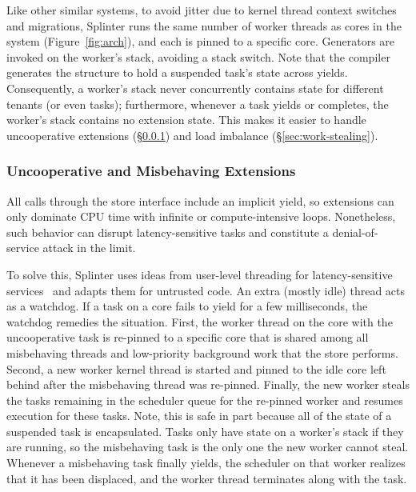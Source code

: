 
Like other similar systems, to avoid jitter due to kernel thread context
    switches and migrations, Splinter runs
    the same number of
  worker threads as cores in the system (Figure~\ref{fig:arch}), and each is
  pinned to a specific core.
Generators are invoked on the worker's stack, avoiding a stack switch.
Note that the compiler generates the structure to hold a suspended
  task's state across yields.
Consequently, a worker's stack never concurrently contains state for
  different tenants (or even tasks); furthermore, whenever a task
  yields or completes, the worker's stack contains no extension state.
This makes it easier to handle uncooperative extensions (\S\ref{sec:uncoop})
  and load imbalance (\S\ref{sec:work-stealing}).

\subsubsection{Uncooperative and Misbehaving Extensions}
\label{sec:uncoop}

All calls through the store interface include an implicit yield, so extensions
  can only dominate CPU time with infinite or compute-intensive loops.
Nonetheless, such behavior can disrupt latency-sensitive tasks and constitute a
  denial-of-service attack in the limit.

To solve this, Splinter uses ideas from user-level threading for
  latency-sensitive services~\cite{arachne-2018} and adapts them for
  untrusted code.
An extra (mostly idle) thread acts as a watchdog.
If a task on a core fails to yield for a few milliseconds, the watchdog
  remedies the situation.
First, the worker thread on the core with the uncooperative task is
  re-pinned to a specific core that is shared among all misbehaving threads
  and low-priority background work that the store performs.
Second, a new worker kernel thread is started and pinned to the idle core left behind
  after the misbehaving thread was re-pinned.
Finally, the new worker steals the tasks remaining in the scheduler queue for
  the re-pinned worker and resumes execution for these tasks.
Note, this is safe in part because all of the state of a suspended task is
  encapsulated.
Tasks only have state on a worker's stack if they are running, so
  the misbehaving task is the only one the new worker cannot steal.
Whenever a misbehaving task finally yields, the scheduler on that worker realizes
  that it has been displaced, and the worker thread terminates along with the task.

